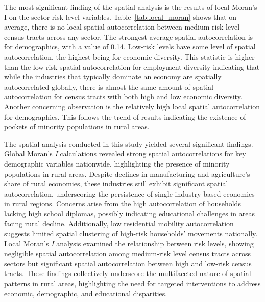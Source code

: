 The most significant finding of the spatial analysis is the results of local Moran's I on the sector risk level variables. Table~\ref{tab:local_moran} shows that on average, there is no local spatial autocorrelation between medium-risk level census tracts across any sector. The strongest average spatial autocorrelation is for demographics, with a value of 0.14. Low-risk levels have some level of spatial autocorrelation, the highest being for economic diversity. This statistic is higher than the low-risk spatial autocorrelation for employment diversity indicating that while the industries that typically dominate an economy are spatially autocorrelated globally, there is almost the same amount of spatial autocorrelation for census tracts with both high and low economic diversity. Another concerning observation is the relatively high local spatial autocorrelation for demographics. This follows the trend of results indicating the existence of pockets of minority populations in rural areas. 


The spatial analysis conducted in this study yielded several significant findings. Global Moran's \textit{I} calculations revealed strong spatial autocorrelations for key demographic variables nationwide, highlighting the presence of minority populations in rural areas. Despite declines in manufacturing and agriculture's share of rural economies, these industries still exhibit significant spatial autocorrelation, underscoring the persistence of single-industry-based economies in rural regions. Concerns arise from the high autocorrelation of households lacking high school diplomas, possibly indicating educational challenges in areas facing rural decline. Additionally, low residential mobility autocorrelation suggests limited spatial clustering of high-risk households' movements nationally. Local Moran's \textit{I} analysis examined the relationship between risk levels, showing negligible spatial autocorrelation among medium-risk level census tracts across sectors but significant spatial autocorrelation between high and low-risk census tracts. These findings collectively underscore the multifaceted nature of spatial patterns in rural areas, highlighting the need for targeted interventions to address economic, demographic, and educational disparities.


